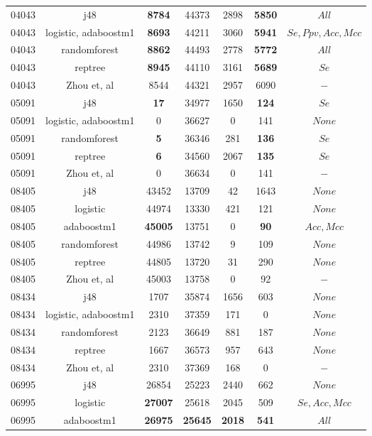\begin{table}[h]
\begin{center}
\begin{threeparttable}
\begin{tabular}{c c c c c c c}
    \hline
    04043 & j48 & \textbf{8784} & 44373 & 2898 & \textbf{5850} & $All$ \\
    04043 & logistic, adaboostm1 & \textbf{8693} & 44211 & 3060 & \textbf{5941} & $Se, Ppv, Acc, Mcc$ \\
    04043 & randomforest & \textbf{8862} & 44493 & 2778 & \textbf{5772} & $All$ \\
    04043 & reptree & \textbf{8945} & 44110 & 3161 & \textbf{5689} & $Se$ \\
    04043 & Zhou et, al & 8544 & 44321 & 2957 & 6090 & $-$ \\
    \hline
    05091 & j48 & \textbf{17} & 34977 & 1650 & \textbf{124} & $Se$ \\
    05091 & logistic, adaboostm1 & 0 & 36627 & 0 & 141 & $None$ \\
    05091 & randomforest & \textbf{5} & 36346 & 281 & \textbf{136} & $Se$ \\
    05091 & reptree & \textbf{6} & 34560 & 2067 & \textbf{135} & $Se$ \\
    05091 & Zhou et, al & 0 & 36634 & 0 & 141 & $-$ \\
    \hline
    08405 & j48 & 43452 & 13709 & 42 & 1643 & $None$ \\
    08405 & logistic & 44974 & 13330 & 421 & 121 & $None$ \\
    08405 & adaboostm1 & \textbf{45005} & 13751 & 0 & \textbf{90} & $Acc, Mcc$ \\
    08405 & randomforest & 44986 & 13742 & 9 & 109 & $None$ \\
    08405 & reptree & 44805 & 13720 & 31 & 290 & $None$ \\
    08405 & Zhou et, al & 45003 & 13758 & 0 & 92 & $-$ \\
    \hline
    08434 & j48 & 1707 & 35874 & 1656 & 603 & $None$ \\
    08434 & logistic, adaboostm1 & 2310 & 37359 & 171 & 0 & $None$ \\
    08434 & randomforest & 2123 & 36649 & 881 & 187 & $None$ \\
    08434 & reptree & 1667 & 36573 & 957 & 643 & $None$ \\
    08434 & Zhou et, al & 2310 & 37369 & 168 & 0 & $-$ \\
    \hline
    06995 & j48 & 26854 & 25223 & 2440 & 662 & $None$ \\
    06995 & logistic & \textbf{27007} & 25618 & 2045 & 509 & $Se, Acc, Mcc$ \\
    06995 & adaboostm1 & \textbf{26975} & \textbf{25645} & \textbf{2018} & \textbf{541} & $All$ \\

\end{tabular}
\end{threeparttable}
\end{center}
\end{table}
